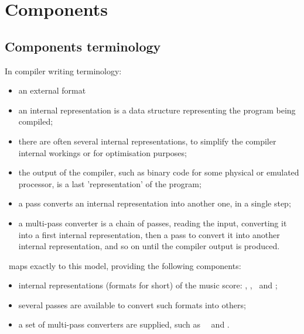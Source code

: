 
\chapter{Components}


\section{Components terminology}

In compiler writing terminology:
\begin{itemize}
\item an external format %
\item an internal representation is a data structure representing the program being compiled;
\item there are often several internal representations, to simplify the compiler internal workings or for optimisation purposes;
\item the output of the compiler, such as binary code for some physical or emulated processor, is a last 'representation' of the program;
\item a pass converts an internal representation into another one, in a single step;
\item a multi-pass converter is a chain of passes, reading the input, converting it into a first internal representation, then a pass to convert it into another internal representation, and so on until the compiler output is produced.
\end{itemize}

\mf\ maps exactly to this model, providing the following components:
\begin{itemize}
\item internal representations (formats for short) of the music score: \msrRepr, \lpsrRepr, \bsrRepr\ and \mxsrRepr;
\item several passes are available to convert such formats into others;
\item a set of multi-pass converters are supplied, such as \xmlToLy\, \xmlToXml\ and \msdLangConv.%
\end{itemize}


